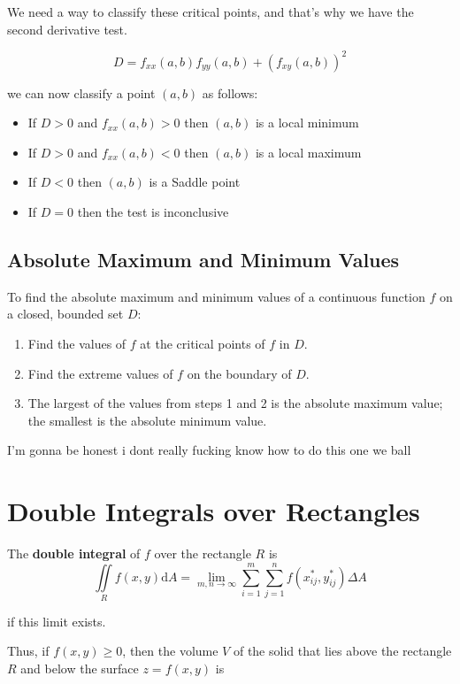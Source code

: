 \documentclass{article}
\begin{document}
We need a way to classify these critical points, and that's why we have the second derivative test.


$$D = f_{xx}(a,b)f_{yy}(a,b) + (f_{xy}(a,b))^2$$

we can now classify a point $(a,b)$ as follows:

\begin{itemize}
    \item If $D > 0$ and $f_{xx}(a,b) >0$ then $(a,b)$ is a local minimum
    \item If $D>0$ and $f_{xx}(a,b)<0$ then $(a,b)$ is a local maximum
    \item If $D<0$ then $(a,b)$ is a Saddle point
    \item If $D=0$ then the test is inconclusive
\end{itemize}

\subsection{Absolute Maximum and Minimum Values}

To find the absolute maximum and minimum values of a continuous function $f$ on a closed, bounded set $D$:

\begin{enumerate}
    \item Find the values of $f$ at the critical points of $f$ in $D$.
    \item Find the extreme values of $f$ on the boundary of $D$.
    \item The largest of the values from steps 1 and 2 is the absolute maximum value; the smallest is the absolute minimum value.
\end{enumerate}

I'm gonna be honest i dont really fucking know how to do this one we ball

\newpage
\section{Double Integrals over Rectangles}

The \textbf{double integral} of $f$ over the rectangle $R$ is
$$\iint\limits_{R}f(x,y)\mathrm{d}A = \lim_{m,n \rightarrow \infty}\sum_{i=1}^{m}\sum_{j=1}^{n}f(x_{ij}^*, y_{ij}^*)\Delta A$$

if this limit exists.

Thus, if $f(x,y) \geq 0$, then the volume $V$ of the solid that lies above the rectangle $R$ and below the surface $z = f(x,y)$ is 
\end{document}
